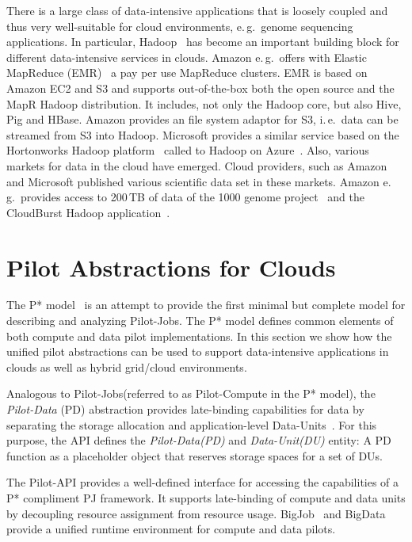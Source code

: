 \documentclass[times]{cpeauth}
\newcommand{\pilot}{Pilot\xspace}
\newcommand{\pilotjobs}{Pilot-Jobs\xspace}
\newcommand{\pilotcompute}{Pilot-Compute\xspace}
\newcommand{\pilotdata}{Pilot-Data\xspace}
\newcommand{\pd}{PD\xspace}
\newcommand{\dataunit}{Data-Unit\xspace}
\newcommand{\dataunits}{Data-Units\xspace}
\newcommand{\dus}{DUs\xspace}
\begin{document}
There is a large class of data-intensive applications that is loosely
coupled and thus very well-suitable for cloud environments, e.\,g.\
genome sequencing applications. In particular, Hadoop~\cite{hadoop}
has become an important building block for different data-intensive
services in clouds. Amazon e.\,g.\ offers with Elastic MapReduce
(EMR)~\cite{amazonemr} a pay per use MapReduce clusters. EMR is based
on Amazon EC2 and S3 and supports out-of-the-box both the open source
and the MapR Hadoop distribution. It includes, not only the
Hadoop core, but also Hive, Pig and HBase. Amazon provides an file
system adaptor for S3, i.\,e.\ data can be streamed from S3 into
Hadoop.  Microsoft provides a similar service based on the Hortonworks
Hadoop platform~\cite{hortonworks} called to Hadoop on
Azure~\cite{hadooponazure}.  Also, various markets for data in the
cloud have emerged. Cloud providers, such as Amazon and Microsoft
published various scientific data set in these markets. Amazon e.\,g.\
provides access to 200\,TB of data of the 1000 genome
project~\cite{amazon-1000genomes} and the CloudBurst Hadoop
application~\cite{schatz2009}.



\section{Pilot Abstractions for Clouds}

The P* model~\cite{pstar12} is an attempt to provide the first minimal but
complete model for describing and analyzing \pilotjobs. The P* model defines
common elements of both compute and data pilot implementations. In this 
section we show how the unified pilot abstractions can be used to support 
data-intensive applications in clouds as well as hybrid grid/cloud 
environments.

Analogous to \pilotjobs (referred to as \pilotcompute in the P* model), the
{\it Pilot-Data} (PD) abstraction provides late-binding capabilities for data
by separating the storage allocation and application-level
\dataunits~\cite{pstar12}. For this purpose, the API defines the {\it
\pilotdata (PD)} and {\it \dataunit (DU)} entity: A \pd function as a
placeholder object that reserves storage spaces for a set of \dus. 

The \pilot-API provides a well-defined interface for accessing the
capabilities of a P* compliment PJ framework. It supports late-binding of
compute and data units by decoupling resource assignment from resource usage.
BigJob~\cite{saga_bigjob_condor_cloud} and 
BigData~\cite{Mantha:2012:PEF:2287016.2287020} provide a unified runtime 
environment for compute and data pilots.
\end{document}
